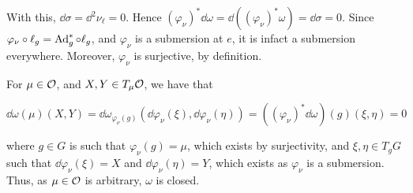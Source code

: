 \documentclass{article}
\begin{document}
With this, \(\dd\sigma = \dd^2\nu_\ell = 0\). Hence \((\varphi_\nu)^*\dd\omega = \dd((\varphi_\nu)^*\omega) = \dd\sigma = 0\). Since \(\varphi_\nu \circ \ell_g = \operatorname{Ad}_g^* \circ \ell_g\), and \(\varphi_\nu\) is a submersion at \(e\), it is infact a submersion everywhere. Moreover, \(\varphi_\nu\) is surjective, by definition.

For \(\mu \in \mathcal{O}\), and \(X, Y \in T_\mu \mathcal{O}\), we have that

\[\dd\omega(\mu)(X, Y) = \dd\omega_{\varphi_\nu(g)}(\dd\varphi_\nu(\xi), \dd\varphi_\nu(\eta)) = ((\varphi_\nu)^*\dd\omega)(g)(\xi, \eta) = 0\]

where \(g \in G\) is such that \(\varphi_\nu(g) = \mu\), which exists by surjectivity, and \(\xi, \eta \in T_gG\) such that \(\dd\varphi_\nu(\xi) = X\) and \(\dd\varphi_\nu(\eta) = Y\), which exists as \(\varphi_\nu\) is a submersion. Thus, as \(\mu \in \mathcal{O}\) is arbitrary, \(\omega\) is closed.
\end{document}
